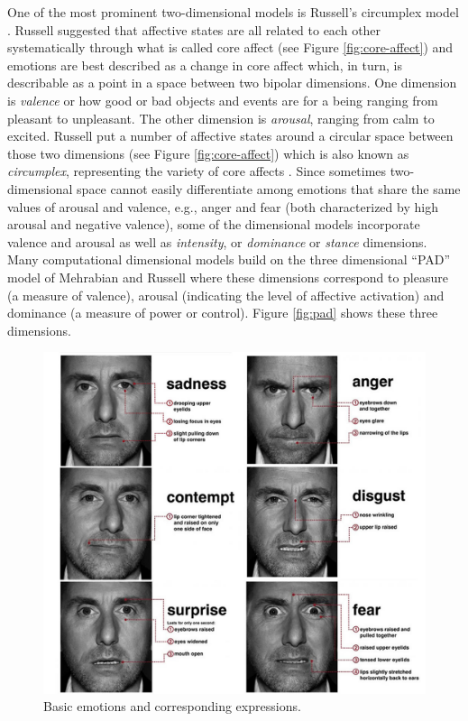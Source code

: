 \documentclass[12pt]{report}
\begin{document}
One of the most prominent two-dimensional models is Russell's circumplex model
\cite{russell:circumplex-affect}. Russell suggested that affective states are
all related to each other systematically through what is called core affect
\cite{russell:circumplex-affect,russell:core-affect} (see Figure
\ref{fig:core-affect}) and emotions are best described as a change in core
affect which, in turn, is describable as a point in a space between two bipolar
dimensions. One dimension is \textit{valence} or how good or bad objects and
events are for a being ranging from pleasant to unpleasant. The other dimension
is \textit{arousal}, ranging from calm to excited. Russell put a number of
affective states around a circular space between those two dimensions (see
Figure \ref{fig:core-affect}) which is also known as \textit{circumplex},
representing the variety of core affects
\cite{russell:circumplex-affect,russell:core-affect}. Since sometimes
two-dimensional space cannot easily differentiate among emotions that share the
same values of arousal and valence, e.g., anger and fear (both characterized by
high arousal and negative valence), some of the dimensional models incorporate
valence and arousal as well as \textit{intensity}, or \textit{dominance} or
\textit{stance} dimensions. Many computational dimensional models build on the
three dimensional “PAD” model of Mehrabian and Russell
\cite{mehrabian-russell:pad} where these dimensions correspond to pleasure (a
measure of valence), arousal (indicating the level of affective activation) and
dominance (a measure of power or control). Figure \ref{fig:pad} shows these
three dimensions.

\begin{figure}[tbh]
  \center
  \includegraphics[width=.9\textwidth]{figure/basic-emotions.jpg}
  \caption{Basic emotions and corresponding expressions.}
  \label{fig:basic-emotions}
\end{figure}
\end{document}

